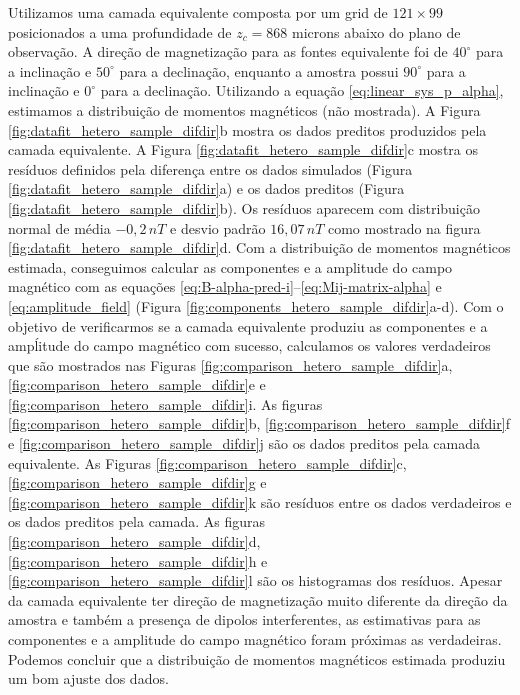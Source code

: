 Utilizamos uma camada equivalente composta por um grid de $121 \times 99$ posicionados a uma profundidade de $z_c = 868$ microns abaixo do plano de observação. 
A direção de magnetização para as fontes equivalente foi de $40^\circ$ para a inclinação e $50^\circ$ para a declinação, enquanto a amostra possui $90^\circ$ para a inclinação e $0^\circ$ para a declinação. 
Utilizando a equação \ref{eq:linear_sys_p_alpha}, estimamos a distribuição de momentos magnéticos (não mostrada). 
A Figura \ref{fig:datafit_hetero_sample_difdir}b mostra os dados preditos produzidos pela camada equivalente. 
A Figura \ref{fig:datafit_hetero_sample_difdir}c mostra os resíduos definidos pela diferença entre os dados simulados (Figura \ref{fig:datafit_hetero_sample_difdir}a) e os dados preditos (Figura \ref{fig:datafit_hetero_sample_difdir}b). Os resíduos aparecem com distribuição normal de média $-0,2 \, nT$ e desvio padrão $16,07 \, nT$ como mostrado na figura \ref{fig:datafit_hetero_sample_difdir}d. Com a distribuição de momentos magnéticos estimada, conseguimos calcular as componentes e a amplitude do campo magnético com as equações \ref{eq:B-alpha-pred-i}--\ref{eq:Mij-matrix-alpha} e \ref{eq:amplitude_field} (Figura \ref{fig:components_hetero_sample_difdir}a-d). Com o objetivo de verificarmos se a camada equivalente produziu as componentes e a ampĺitude do campo magnético com sucesso, calculamos os valores verdadeiros que são mostrados nas Figuras \ref{fig:comparison_hetero_sample_difdir}a, \ref{fig:comparison_hetero_sample_difdir}e e \ref{fig:comparison_hetero_sample_difdir}i. As figuras \ref{fig:comparison_hetero_sample_difdir}b, \ref{fig:comparison_hetero_sample_difdir}f e \ref{fig:comparison_hetero_sample_difdir}j são os dados preditos pela camada equivalente. 
As Figuras \ref{fig:comparison_hetero_sample_difdir}c, \ref{fig:comparison_hetero_sample_difdir}g e \ref{fig:comparison_hetero_sample_difdir}k são resíduos entre os dados verdadeiros e os dados preditos pela camada. As figuras \ref{fig:comparison_hetero_sample_difdir}d, \ref{fig:comparison_hetero_sample_difdir}h e \ref{fig:comparison_hetero_sample_difdir}l são os histogramas dos resíduos. Apesar da camada equivalente ter direção de magnetização muito diferente da direção da amostra e também a presença de dipolos interferentes, as estimativas para as componentes e a amplitude do campo magnético foram próximas as verdadeiras. Podemos concluir que a distribuição de momentos magnéticos estimada produziu um bom ajuste dos dados.   


